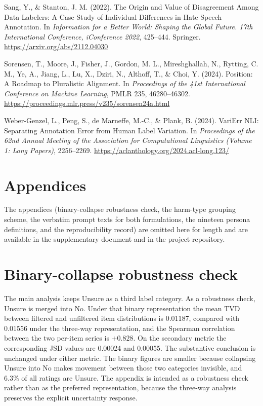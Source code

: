 \documentclass[11pt,a4paper]{article}
\newif\ifshortversion
\begin{document}
\begin{description}[leftmargin=1.6em,style=unboxed,itemsep=0.3em]
\item Sang, Y., \& Stanton, J. M. (2022). The Origin and Value of Disagreement Among Data
Labelers: A Case Study of Individual Differences in Hate Speech Annotation. In
\emph{Information for a Better World: Shaping the Global Future. 17th International Conference,
iConference 2022}, 425--444. Springer. \url{https://arxiv.org/abs/2112.04030}

\item Sorensen, T., Moore, J., Fisher, J., Gordon, M. L., Mireshghallah, N., Rytting, C. M., Ye,
A., Jiang, L., Lu, X., Dziri, N., Althoff, T., \& Choi, Y. (2024). Position: A Roadmap to
Pluralistic Alignment. In \emph{Proceedings of the 41st International Conference on Machine
Learning}, PMLR 235, 46280--46302.
\url{https://proceedings.mlr.press/v235/sorensen24a.html}

\item Weber-Genzel, L., Peng, S., de Marneffe, M.-C., \& Plank, B. (2024). VariErr NLI:
Separating Annotation Error from Human Label Variation. In \emph{Proceedings of the 62nd Annual
Meeting of the Association for Computational Linguistics (Volume 1: Long Papers)}, 2256--2269.
\url{https://aclanthology.org/2024.acl-long.123/}

\end{description}

\ifshortversion
\section*{Appendices}
The appendices (binary-collapse robustness check, the harm-type grouping scheme, the verbatim
prompt texts for both formulations, the nineteen persona definitions, and the reproducibility
record) are omitted here for length and are available in the supplementary document and in the
project repository.
\else

\appendix
\section{Binary-collapse robustness check}

The main analysis keeps Unsure as a third label category. As a robustness check, Unsure is merged
into No. Under that binary representation the mean TVD between filtered and unfiltered item
distributions is 0.01187, compared with 0.01556 under the three-way representation, and the
Spearman correlation between the two per-item series is $+0.828$. On the secondary metric the
corresponding JSD values are 0.00024 and 0.00055. The substantive conclusion is unchanged under
either metric. The binary figures are smaller because collapsing Unsure into No makes movement
between those two categories invisible, and 6.3\% of all ratings are Unsure. The appendix is intended as a robustness check rather than as the
preferred representation, because the three-way analysis preserves the explicit uncertainty
response.
\end{document}
